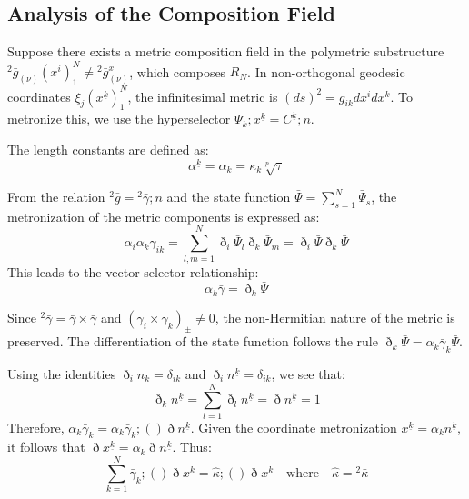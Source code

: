 \documentclass[11pt,a4paper,oneside]{article}
\newcommand{\ethop}{\eth}
\begin{document}
\subsection{Analysis of the Composition Field}

Suppose there exists a metric composition field in the polymetric substructure ${}^2 \bar{g}_{(\nu)}(x^i)_1^N \neq {}^2 \bar{g}^x_{(\nu)}$, which composes $R_N$. In non-orthogonal geodesic coordinates $\xi_j(x^{\underline{k}})_1^N$, the infinitesimal metric is $(ds)^2 = g_{ik} dx^i dx^k$. To metronize this, we use the hyperselector $\Psi_k; x^{\underline{k}} = C^{\underline{k}}; n$.

The length constants are defined as:
\begin{equation*}
    \alpha^{\underline{k}} = \alpha_k = \kappa_k \sqrt[p]{\tau}
\end{equation*}

From the relation ${}^2 \bar{g} = {}^2 \bar{\gamma}; n$ and the state function $\bar{\Psi} = \sum_{s=1}^N \bar{\Psi}_s$, the metronization of the metric components is expressed as:
\begin{equation*}
    \alpha_i \alpha_k \gamma_{ik} = \sum_{l, m = 1}^N \ethop_i \bar{\Psi}_l \ethop_k \bar{\Psi}_m = \ethop_i \bar{\Psi} \ethop_k \bar{\Psi}
\end{equation*}
This leads to the vector selector relationship:
\begin{equation*}
    \alpha_k \bar{\gamma} = \ethop_k \bar{\Psi}
\end{equation*}

Since ${}^2 \bar{\gamma} = \bar{\gamma} \times \bar{\gamma}$ and $(\gamma_i \times \gamma_k)_{\pm} \neq 0$, the non-Hermitian nature of the metric is preserved. The differentiation of the state function follows the rule $\ethop_k \bar{\Psi} = \alpha_k \bar{\gamma}_k \bar{\Psi}$.

Using the identities $\ethop_i n_k = \delta_{ik}$ and $\ethop_i n^{\underline{k}} = \delta_{ik}$, we see that:
\begin{equation*}
    \ethop_k n^{\underline{k}} = \sum_{l=1}^N \ethop_l n^{\underline{k}} = \ethop n^{\underline{k}} = 1
\end{equation*}
Therefore, $\alpha_k \bar{\gamma}_k = \alpha_k \bar{\gamma}_k; () \ethop n^{\underline{k}}$. Given the coordinate metronization $x^{\underline{k}} = \alpha_k n^{\underline{k}}$, it follows that $\ethop x^{\underline{k}} = \alpha_k \ethop n^{\underline{k}}$. Thus:
\begin{equation*}
    \sum_{k=1}^N \bar{\gamma}_k; () \ethop x^{\underline{k}} = \hat{\kappa}; () \ethop x^{\underline{k}} \quad \text{where} \quad \hat{\kappa} = {}^2 \bar{\kappa}
\end{equation*}
\end{document}
